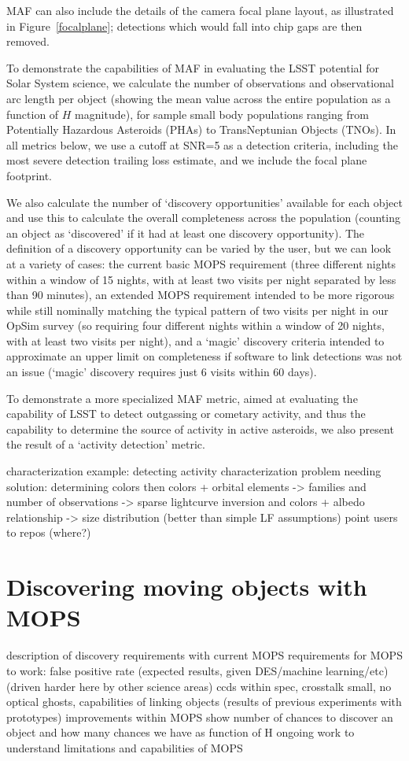 \documentclass{iau}
\begin{document}
MAF can also include the details of the camera focal plane layout, as
illustrated in Figure~\ref{focalplane}; detections which would fall into
chip gaps are then removed.

To demonstrate the capabilities of MAF in evaluating the LSST
potential for Solar System science, we calculate the number of
observations and observational arc length per object (showing the mean
value across the entire population as a function of $H$ magnitude),
for sample small body populations ranging from Potentially Hazardous
Asteroids (PHAs) to TransNeptunian Objects (TNOs). In all metrics
below, we use a cutoff at SNR=5 as a detection criteria, including the
most severe detection trailing loss estimate, and we include
the focal plane footprint.

We also calculate the number of `discovery opportunities' available
for each object and use this to calculate the overall completeness
across the population (counting an object as `discovered' if it had at
least one discovery opportunity). The definition of a discovery
opportunity can be varied by the user, but we can look at a variety of
cases: the current basic MOPS requirement (three different nights
within a window of 15 nights, with at least two visits per night
separated by less than 90 minutes), an extended MOPS requirement
intended to be more rigorous while still nominally matching the
typical pattern of two visits per night in our OpSim survey (so
requiring four different nights within a window of 20 nights, with at
least two visits per night), and a `magic' discovery criteria intended
to approximate an upper limit on completeness if software to link
detections was not an issue (`magic' discovery requires just 6 visits
within 60 days).

To demonstrate a more specialized MAF metric, aimed at evaluating the
capability of LSST to detect outgassing or cometary activity, and thus
the capability to determine the source of activity in active
asteroids, we also present the result of a `activity detection'
metric. 

characterization example: detecting activity
characterization problem needing solution: determining colors
then colors + orbital elements -> families
and number of observations -> sparse lightcurve inversion
and colors + albedo relationship -> size distribution (better than
simple LF assumptions)
point users to repos (where?)

\section{Discovering moving objects with MOPS}
description of discovery requirements with current MOPS
requirements for MOPS to work:
 false positive rate (expected results, given DES/machine
 learning/etc) (driven harder here by other science areas)
   ccds within spec, crosstalk small, no optical ghosts, 
 capabilities of linking objects (results of previous experiments with
 prototypes)  improvements within MOPS
show number of chances to discover an object and how many chances we
have as function of H 
ongoing work to understand limitations and capabilities of MOPS
\end{document}
